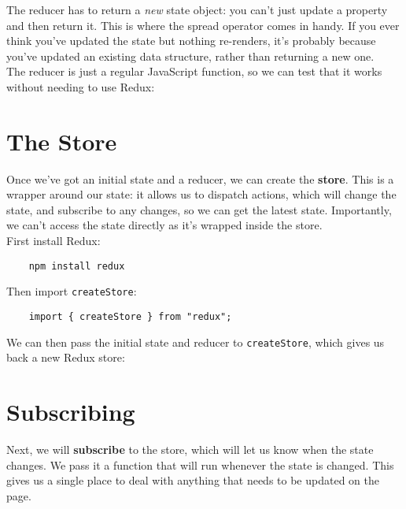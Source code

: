 
The reducer has to return a \textit{new} state object: you can't just update a property and then return it. This is where the spread operator comes in handy. If you ever think you've updated the state but nothing re-renders, it's probably because you've updated an existing data structure, rather than returning a new one.
\\

The reducer is just a regular JavaScript function, so we can test that it works without needing to use Redux:




\section{The Store}

Once we've got an initial state and a reducer, we can create the \textbf{store}. This is a wrapper around our state: it allows us to dispatch actions, which will change the state, and subscribe to any changes, so we can get the latest state. Importantly, we can't access the state directly as it's wrapped inside the store.
\\

First install Redux:

\begin{verbatim}
    npm install redux
\end{verbatim}

Then import \texttt{createStore}:

\begin{verbatim}
    import { createStore } from "redux";
\end{verbatim}

We can then pass the initial state and reducer to \texttt{createStore}, which gives us back a new Redux store:




\section{Subscribing}

Next, we will \textbf{subscribe} to the store, which will let us know when the state changes. We pass it a function that will run whenever the state is changed. This gives us a single place to deal with anything that needs to be updated on the page.
\\

